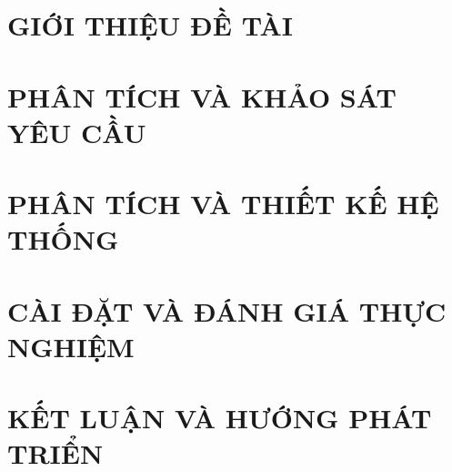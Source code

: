 \documentclass[a4paper,13pt,3p,twoside]{report}
\theoremstyle{definition}
\begin{document}
\glsaddall 
 \renewcommand*{\glossaryname}{Danh sách thuật ngữ}
\renewcommand*{\acronymname}{DANH MỤC THUẬT NGỮ VÀ TỪ VIẾT TẮT}
\renewcommand*{\entryname}{Thuật ngữ}
\renewcommand*{\descriptionname}{Ý nghĩa}
\printnoidxglossaries


% 


\newpage
{}

\pagestyle{fancy}
\fancyhf{}
\fancyhead[RE, LO]{\leftmark}
\fancyfoot[RE, LO]{\thepage}

\chapter{GIỚI THIỆU ĐỀ TÀI}
\label{chapter:Introduction}

\newpage
\chapter{PHÂN TÍCH VÀ KHẢO SÁT YÊU CẦU}
\label{chapter:Related_works}



\newpage
\chapter{PHÂN TÍCH VÀ THIẾT KẾ HỆ THỐNG}
\label{chapter:Methodology}


\newpage
\chapter{CÀI ĐẶT VÀ ĐÁNH GIÁ THỰC NGHIỆM}
\label{chapter:Experiment}


\chapter{KẾT LUẬN VÀ HƯỚNG PHÁT TRIỂN} %
\label{chapter:conclusion}

\end{document}
